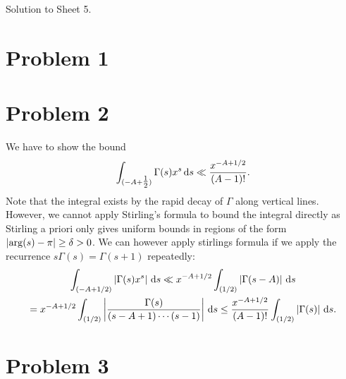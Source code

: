 \documentclass[a4paper,11pt]{article}
\author{Max von Consbruch}
\begin{document}
\begin{center}
    \huge{Solution to Sheet 5.}
\end{center}

\section*{Problem 1}

\section*{Problem 2}
We have to show the bound
\[
    \int_{(-A + \tfrac 12)} \Gamma(s) x^s \mathrm{\,d} s \ll \frac{x^{-A +
    1/2}}{(A-1)!}.
\]
Note that the integral exists by the rapid decay of $\Gamma$ along vertical
lines. However, we cannot apply Stirling's formula to bound the integral directly
as Stirling a priori only gives uniform bounds in regions of the form $\left\lvert \arg(s)
- \pi \right\rvert \geq \delta > 0$. We can however apply stirlings formula if we apply the recurrence
$s\Gamma(s) = \Gamma(s+1)$ repeatedly: 
\begin{multline*}
    \int_{(-A+1/2)} \left\lvert \Gamma(s) x^s \right\rvert \mathrm{\,d} s \ll 
    x^{-A+1/2} \int_{(1/2)} \left\lvert \Gamma(s-A) \right\rvert \mathrm{\,d} s \\ 
    = x^{-A+1/2} \int_{(1/2)} \left\lvert \frac {\Gamma(s)}{(s-A+1) \cdots (s-1)} \right\rvert
    \mathrm{\,d} s \leq \frac{x^{-A + 1/2}}{(A-1)!} \int_{(1/2)} \left\lvert \Gamma(s) \right\rvert \mathrm{\,d} s. 
\end{multline*}

\section*{Problem 3}
\end{document}

